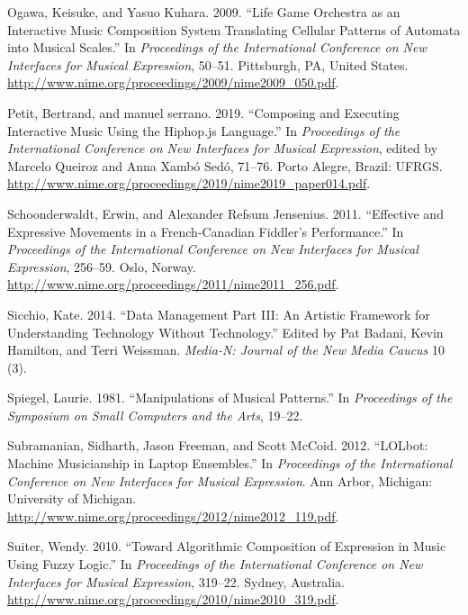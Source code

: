 \documentclass{nime-alternate} %
\newlength{\cslhangindent}
\newenvironment{cslreferences}%
  {\setlength{\parindent}{0pt}%
  \everypar{\setlength{\hangindent}{\cslhangindent}}\ignorespaces}%
  {\par}
\begin{document}
\begin{cslreferences}
\leavevmode\hypertarget{ref-Ogawa2009}{}%
Ogawa, Keisuke, and Yasuo Kuhara. 2009. ``Life Game Orchestra as an
Interactive Music Composition System Translating Cellular Patterns of
Automata into Musical Scales.'' In \emph{Proceedings of the
International Conference on New Interfaces for Musical Expression},
50--51. Pittsburgh, PA, United States.
\url{http://www.nime.org/proceedings/2009/nime2009_050.pdf}.

\leavevmode\hypertarget{ref-Petit2019}{}%
Petit, Bertrand, and manuel serrano. 2019. ``Composing and Executing
Interactive Music Using the Hiphop.js Language.'' In \emph{Proceedings
of the International Conference on New Interfaces for Musical
Expression}, edited by Marcelo Queiroz and Anna Xambó Sedó, 71--76.
Porto Alegre, Brazil: UFRGS.
\url{http://www.nime.org/proceedings/2019/nime2019_paper014.pdf}.

\leavevmode\hypertarget{ref-Schoonderwaldt2011}{}%
Schoonderwaldt, Erwin, and Alexander Refsum Jensenius. 2011. ``Effective
and Expressive Movements in a French-Canadian Fiddler's Performance.''
In \emph{Proceedings of the International Conference on New Interfaces
for Musical Expression}, 256--59. Oslo, Norway.
\url{http://www.nime.org/proceedings/2011/nime2011_256.pdf}.

\leavevmode\hypertarget{ref-Sicchio14}{}%
Sicchio, Kate. 2014. ``Data Management Part III: An Artistic Framework
for Understanding Technology Without Technology.'' Edited by Pat Badani,
Kevin Hamilton, and Terri Weissman. \emph{Media-N: Journal of the New
Media Caucus} 10 (3).

\leavevmode\hypertarget{ref-Spiegel81}{}%
Spiegel, Laurie. 1981. ``Manipulations of Musical Patterns.'' In
\emph{Proceedings of the Symposium on Small Computers and the Arts},
19--22.

\leavevmode\hypertarget{ref-Subramanian2012}{}%
Subramanian, Sidharth, Jason Freeman, and Scott McCoid. 2012. ``LOLbot:
Machine Musicianship in Laptop Ensembles.'' In \emph{Proceedings of the
International Conference on New Interfaces for Musical Expression}. Ann
Arbor, Michigan: University of Michigan.
\url{http://www.nime.org/proceedings/2012/nime2012_119.pdf}.

\leavevmode\hypertarget{ref-Suiter2010}{}%
Suiter, Wendy. 2010. ``Toward Algorithmic Composition of Expression in
Music Using Fuzzy Logic.'' In \emph{Proceedings of the International
Conference on New Interfaces for Musical Expression}, 319--22. Sydney,
Australia. \url{http://www.nime.org/proceedings/2010/nime2010_319.pdf}.


\end{cslreferences}
\end{document}
